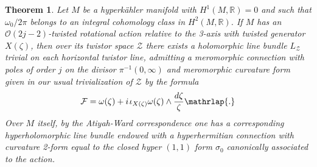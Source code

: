 \documentclass[11pt]{amsart}
\newtheorem{theorem}{Theorem}%
\theoremstyle{remark}
\theoremstyle{remark}
\theoremstyle{definition}
\theoremstyle{definition}
\theoremstyle{definition}
\newcommand{\0}{{\scriptstyle 0'}} %
\newcommand{\1}{{\scriptstyle 1'}}
\newcommand{\pt}{\hspace{1pt}} %
\begin{document}
\begin{theorem} \label{main_th}
Let $M$ be a hyperk\"ahler manifold with $H^1(M,\mathbb{R}) = 0$ and such that $\omega_0/2\pi$ belongs to an integral cohomology class in $H^2(M,\mathbb{R})$. If $M$ has an $\mathcal{O}(2j-2)$-twisted rotational action relative to the 3-axis with twisted generator $X(\zeta)$, then over its twistor space $\mathcal{Z}$ there exists a holomorphic line bundle $L_{\mathcal{Z}}$ trivial on each horizontal twistor line, admitting a meromorphic connection with poles of order $j$ on the divisor $\pi^{-1}(0,\infty)$ and meromorphic curvature form given in our usual trivialization of $\mathcal{Z}$ by the formula
\begin{equation}
\mathcal{F} = \omega(\zeta) + i \pt \iota_{X(\zeta)}\omega(\zeta) \wedge \frac{d\zeta}{\zeta} \mathrlap{.}
\end{equation}
Over $M$ itself, by the Atiyah\pt-Ward correspondence one has a corresponding hyperholomorphic line bundle endowed with a hyperhermitian connection with curvature 2-form equal to the closed hyper $(1,1)$ form $\sigma_0$ canonically associated to the action.
\smallskip
\end{theorem}


\subsubsection{} \label{ssec:cof}
\end{document}
